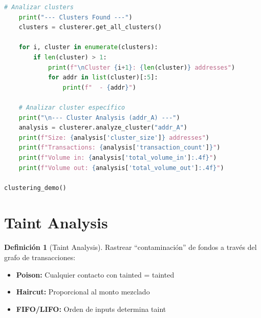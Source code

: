\documentclass[11pt,a4paper,twoside]{book}
\theoremstyle{definition}
\newtheorem{definition}{Definición}[chapter]
\theoremstyle{remark}
\begin{document}
\begin{lstlisting}[language=Python, caption={Sistema de Graph Analysis y Clustering}]
    # Analizar clusters
    print("--- Clusters Found ---")
    clusters = clusterer.get_all_clusters()
    
    for i, cluster in enumerate(clusters):
        if len(cluster) > 1:
            print(f"\nCluster {i+1}: {len(cluster)} addresses")
            for addr in list(cluster)[:5]:
                print(f"  - {addr}")
    
    # Analizar cluster específico
    print("\n--- Cluster Analysis (addr_A) ---")
    analysis = clusterer.analyze_cluster("addr_A")
    print(f"Size: {analysis['cluster_size']} addresses")
    print(f"Transactions: {analysis['transaction_count']}")
    print(f"Volume in: {analysis['total_volume_in']:.4f}")
    print(f"Volume out: {analysis['total_volume_out']:.4f}")

clustering_demo()
\end{lstlisting}

\section{Taint Analysis}
\label{sec:taint-analysis}

\begin{definition}[Taint Analysis]
Rastrear ``contaminación'' de fondos a través del grafo de transacciones:
\begin{itemize}
    \item \textbf{Poison:} Cualquier contacto con tainted = tainted
    \item \textbf{Haircut:} Proporcional al monto mezclado
    \item \textbf{FIFO/LIFO:} Orden de inputs determina taint
\end{itemize}
\end{definition}
\end{document}
